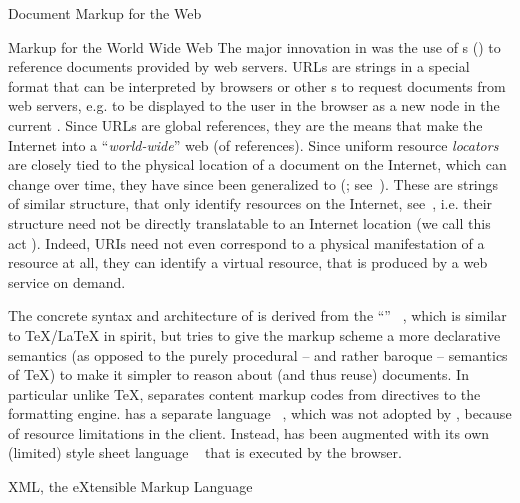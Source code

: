 \begin{tchapter}[id=markup-web]{Document Markup for the Web}
\begin{tsection}[id=markup:www]{Markup for the World Wide Web}{}
The major innovation in {\html} was the use of {s}
({}) to reference documents provided by web servers. URLs are strings in a
special format that can be interpreted by browsers or other {s} to
request documents from web servers, e.g. to be displayed to the user in the browser as a
new node in the current {}. Since URLs are global references,
they are the means that make the Internet into a ``{\em{world-wide}}'' web (of
references).  Since uniform resource {\emph{locators}} are closely tied to the physical
location of a document on the Internet, which can change over time, they have since been
generalized to {} ({};
see~\cite{BerFie:uri98}). These are strings of similar structure, that only identify
resources on the Internet, see~\cite{Harold:xb01}, i.e. their structure need not be
directly translatable to an Internet location (we call this act
{}). Indeed, URIs need not even correspond to a physical
manifestation of a resource at all, they can identify a virtual resource, that is produced
by a web service on demand.

The concrete syntax and architecture of {\html} is derived from the ``{}'' {\sgml}~\cite{Goldfarb:sgml90}, which is similar to
{\TeX/LaTeX} in spirit, but tries to give the markup scheme a more declarative semantics
(as opposed to the purely procedural -- and rather baroque -- semantics of {\TeX}) to make
it simpler to reason about (and thus reuse) documents. In particular unlike {\TeX},
{\sgml} separates content markup codes from directives to the formatting engine.  {\sgml}
has a separate {} language
{\dsssl}~\cite{DuCharme:fddsj97}, which was not adopted by {\html}, because of resource
limitations in the client. Instead, {\html} has been augmented with its own (limited)
style sheet language {\css}~\cite{BosHak:css98} that is executed by the browser.
\end{tsection}

\begin{tsection}[id=xml]{XML, the eXtensible Markup Language}


\end{tsection}
\end{tchapter}
